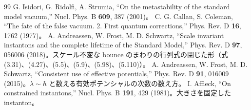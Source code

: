 \documentclass[a4paper,10pt]{ltjsarticle}
\begin{document}
\begin{thebibliography}{99}
 G. Isidori, G. Ridolfi, A. Strumia, ``On the metastability of the standard model vacuum,'' Nucl. Phys. B \textbf{609}, 387 (2001)。
 C. G. Callan, S. Coleman, ``The fate of the false vacuum. 2. First quantum corrections,'' Phys. Rev. D \textbf{16}, 1762 (1977)。
 A. Andreassen, W. Frost, M. D. Schwartz, ``Scale invariant instantons and the complete lifetime of the Standard Model,'' Phys. Rev. D \textbf{97}, 056006 (2018)。スケール不変な bounce のまわりの行列式の閉じた形（式 (3.31)、(4.27)、(5.5)、(5.9)、(5.98)、(5.110)）。
 A. Andreassen, W. Frost, M. D. Schwartz, ``Consistent use of effective potentials,'' Phys. Rev. D \textbf{91}, 016009 (2015)。$\lambda\sim\hbar$ と数える有効ポテンシャルの次数の数え方。
 I. Affleck, ``On constrained instantons,'' Nucl. Phys. B \textbf{191}, 429 (1981)。大きさを固定した instanton。
\end{thebibliography}
\end{document}
